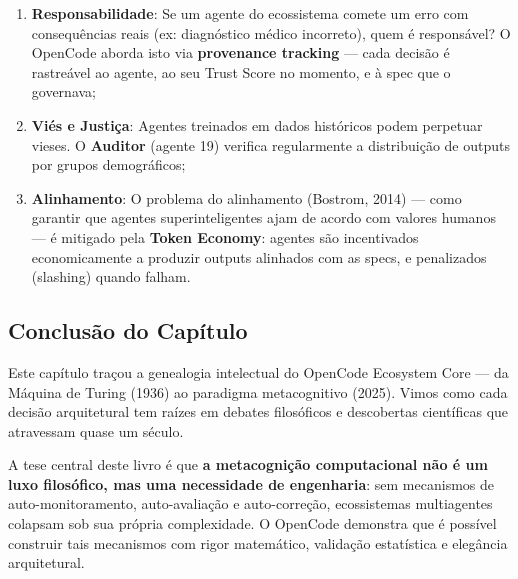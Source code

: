 \begin{enumerate}
    \item \textbf{Responsabilidade}: Se um agente do ecossistema comete um erro com consequências reais (ex: diagnóstico médico incorreto), quem é responsável? O OpenCode aborda isto via \textbf{provenance tracking} --- cada decisão é rastreável ao agente, ao seu Trust Score no momento, e à spec que o governava;
    
    \item \textbf{Viés e Justiça}: Agentes treinados em dados históricos podem perpetuar vieses. O \textbf{Auditor} (agente 19) verifica regularmente a distribuição de outputs por grupos demográficos;
    
    \item \textbf{Alinhamento}: O problema do alinhamento (Bostrom, 2014) \cite{bostrom2014superintelligence} --- como garantir que agentes superinteligentes ajam de acordo com valores humanos --- é mitigado pela \textbf{Token Economy}: agentes são incentivados economicamente a produzir outputs alinhados com as specs, e penalizados (slashing) quando falham.
\end{enumerate}

\subsection{Conclusão do Capítulo}

Este capítulo traçou a genealogia intelectual do OpenCode Ecosystem Core --- da Máquina de Turing (1936) ao paradigma metacognitivo (2025). Vimos como cada decisão arquitetural tem raízes em debates filosóficos e descobertas científicas que atravessam quase um século.

A tese central deste livro é que \textbf{a metacognição computacional não é um luxo filosófico, mas uma necessidade de engenharia}: sem mecanismos de auto-monitoramento, auto-avaliação e auto-correção, ecossistemas multiagentes colapsam sob sua própria complexidade. O OpenCode demonstra que é possível construir tais mecanismos com rigor matemático, validação estatística e elegância arquitetural.


